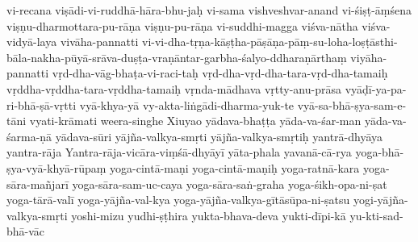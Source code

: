 {vi-recana
    viṣādi-vi-ruddhā-hāra-bhu-jaḥ
    vi-sama
vishveshvar-anand
vi-śiṣṭ-āṃśena
viṣṇu-dharmottara-pu-rāṇa
    viṣṇu-pu-rāṇa 
vi-suddhi-magga
viśva-nātha
viśva-vidyā-laya
vivāha-pannatti
vi-vi-dha-tṛṇa-kāṣṭha-pāṣāṇa-pāṃ-su-loha-loṣṭāsthi-bāla-nakha-pūyā-srāva-duṣṭa-vraṇāntar-garbha-śalyo-ddharaṇārthaṃ
viyāha-pannatti
vṛd-dha-vāg-bhaṭa-vi-raci-taḥ
vṛd-dha-vṛd-dha-tara-vṛd-dha-tamaiḥ
vṛddha-vṛddha-tara-vṛddha-tamaiḥ
vṛnda-mādhava
vṛtty-anu-prāsa
vyāḍī-ya-pa-ri-bhā-ṣā-vṛtti
vyā-khya-yā
vy-akta-liṅgādi-dharma-yuk-te
vyā-sa-bhā-ṣya-sam-e-tāni
vyati-krāmati
weera-singhe
Xiuyao
yādava-bhaṭṭa
yāda-va-śar-man
yāda-va-śarma-ṇā
yādava-sūri
yājña-valkya-smṛti
yājña-valkya-smṛtiḥ
yantrā-dhyāya
yantra-rāja
Yantra-rāja-vicāra-viṃśā-dhyāyī
yāta-phala
yavanā-cā-rya
yoga-bhā-ṣya-vyā-khyā-rūpaṃ
yoga-cintā-maṇi
yoga-cintā-maṇiḥ
yoga-ratnā-kara
yoga-sāra-mañjarī
yoga-sāra-sam-uc-caya
yoga-sāra-saṅ-graha
yoga-śikh-opa-ni-ṣat
yoga-tārā-valī
yoga-yājña-val-kya
yoga-yājña-valkya-gītāsūpa-ni-ṣatsu
yogi-yājña-valkya-smṛti
yoshi-mizu
yudhi-ṣṭhira
yukta-bhava-deva
    yukti-dīpi-kā
    yu-kti-sad-bhā-vāc
}
